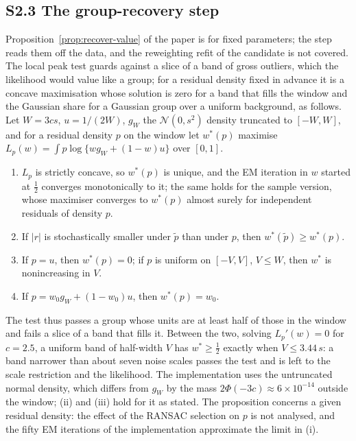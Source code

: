 \subsection*{S2.3 The group-recovery step}
\label{app:recovery}

Proposition~\ref{prop:recover-value} of the paper is for fixed parameters; the step
reads them off the data, and the reweighting refit of the candidate is not covered. The local
peak test guards against a slice of a band of gross outliers, which the likelihood would value
like a group; for a residual density fixed in advance it is a concave maximisation whose
solution is zero for a band that fills the window and the Gaussian share for a Gaussian group
over a uniform background, as follows. Let $W=3cs$, $u=1/(2W)$, $g_W$ the $\mathcal N(0,s^{2})$ density
truncated to $[-W,W]$, and for a residual density $p$ on the window let $w^\ast(p)$ maximise
$L_p(w)=\int p\log\{wg_W+(1-w)u\}$ over $[0,1]$.

\begin{proposition}
\label{prop:recover-peak}
\begin{enumerate}[label=(\roman*),leftmargin=2.2em,itemsep=2pt]
\item $L_p$ is strictly concave, so $w^\ast(p)$ is unique, and the EM iteration in $w$
started at $\tfrac12$ converges monotonically to it; the same holds for the sample version,
whose maximiser converges to $w^\ast(p)$ almost surely for independent residuals of density $p$.
\item If $|r|$ is stochastically smaller under $\tilde p$ than under $p$, then
$w^\ast(\tilde p)\ge w^\ast(p)$.
\item If $p=u$, then $w^\ast(p)=0$; if $p$ is uniform on $[-V,V]$, $V\le W$, then $w^\ast$
is nonincreasing in $V$.
\item If $p=w_0g_W+(1-w_0)u$, then $w^\ast(p)=w_0$.
\end{enumerate}
\end{proposition}

The test thus passes a group whose units are at least half of those in the window and fails
a slice of a band that fills it. Between the two, solving $L_p'(w)=0$ for $c=2.5$, a uniform
band of half-width $V$ has $w^\ast\ge\tfrac12$ exactly when $V\le3.44\,s$: a band narrower
than about seven noise scales passes the test and is left to the scale restriction and the
likelihood. The implementation uses the untruncated normal density, which differs from
$g_W$ by the mass $2\Phi(-3c)\approx6\times10^{-14}$ outside the window; (ii) and (iii) hold
for it as stated. The proposition concerns a given residual density: the effect of the RANSAC
selection on $p$ is not analysed, and the fifty EM iterations of the implementation
approximate the limit in (i).


